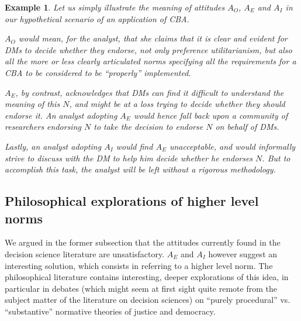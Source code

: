 \documentclass[preprint, french, english, 11pt, authoryear]{elsarticle}%
\newtheorem{example}{Example}
\begin{document}
\begin{example}
Let us simply illustrate the meaning of attitudes $A_O$, $A_E$ and $A_I$ in our hypothetical scenario of an application of \ac{CBA}.

$A_O$ would mean, for the analyst, that she claims that it is clear and evident for \acp{DM} to decide whether they endorse, not only preference utilitarianism, but also all the more or less clearly articulated norms specifying all the requirements for a \ac{CBA} to be considered to be ``properly'' implemented.

$A_E$, by contrast, acknowledges that \acp{DM} can find it difficult to understand the meaning of this $N$, and might be at a loss trying to decide whether they should endorse it. An analyst adopting $A_E$ would hence fall back upon a community of researchers endorsing $N$ to take the decision to endorse $N$ on behalf of \acp{DM}.

Lastly, an analyst adopting $A_I$ would find $A_E$ unacceptable, and would informally strive to discuss with the \ac{DM} to help him decide whether he endorses $N$. But to accomplish this task, the analyst will be left without a rigorous methodology.
\end{example}

\subsection{Philosophical explorations of higher level norms}
\label{sec:higher}
We argued in the former subsection that the attitudes currently found in the decision science literature are unsatisfactory. $A_E$ and $A_I$ however suggest an interesting solution, which consists in referring to a higher level norm. The philosophical literature contains interesting, deeper explorations of this idea, in particular in debates (which might seem at first sight quite remote from the subject matter of the literature on decision sciences) on “purely procedural” vs. “substantive” normative theories of justice and democracy.
\end{document}
